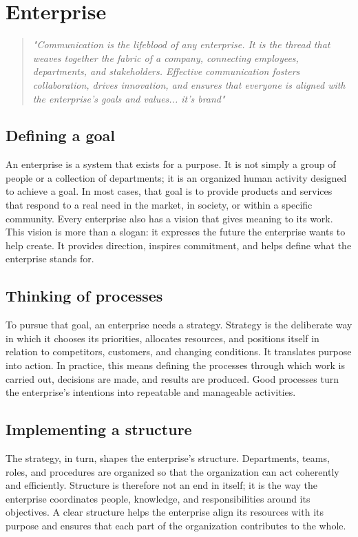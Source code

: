 \chapter{Enterprise}
\label{chap:enterprise}

\begin{quote}
\textit{"Communication is the lifeblood of any enterprise. It is the thread that weaves together the fabric of a company, connecting employees, departments, and stakeholders. Effective communication fosters collaboration, drives innovation, and ensures that everyone is aligned with the enterprise's goals and values... it's brand"}
\end{quote}

\section{Defining a goal}
An enterprise is a system that exists for a purpose. It is not simply a group of people or a collection of departments; it is an organized human activity designed to achieve a goal. In most cases, that goal is to provide products and services that respond to a real need in the market, in society, or within a specific community. Every enterprise also has a vision that gives meaning to its work. This vision is more than a slogan: it expresses the future the enterprise wants to help create. It provides direction, inspires commitment, and helps define what the enterprise stands for.

\section{Thinking of processes}
To pursue that goal, an enterprise needs a strategy. Strategy is the deliberate way in which it chooses its priorities, allocates resources, and positions itself in relation to competitors, customers, and changing conditions. It translates purpose into action. In practice, this means defining the processes through which work is carried out, decisions are made, and results are produced. Good processes turn the enterprise's intentions into repeatable and manageable activities.

\section{Implementing a structure}
The strategy, in turn, shapes the enterprise's structure. Departments, teams, roles, and procedures are organized so that the organization can act coherently and efficiently. Structure is therefore not an end in itself; it is the way the enterprise coordinates people, knowledge, and responsibilities around its objectives. A clear structure helps the enterprise align its resources with its purpose and ensures that each part of the organization contributes to the whole.

